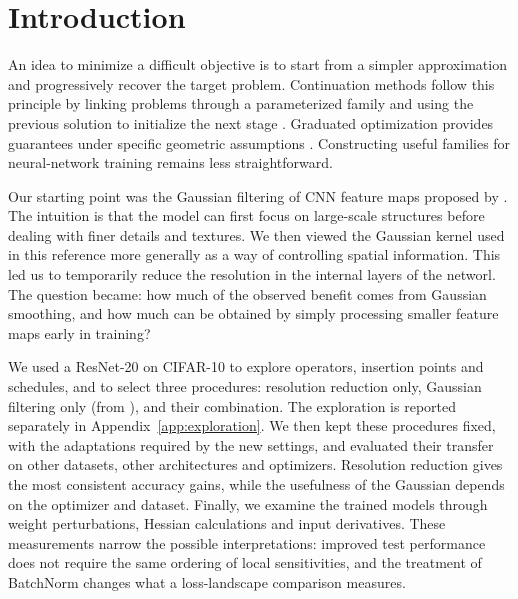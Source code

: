 \section{Introduction}
\label{sec:introduction}
An idea to minimize a difficult objective is to start from a simpler approximation and progressively recover the target problem. Continuation methods follow this principle by linking problems through a parameterized family and using the previous solution to initialize the next stage \citep{allgower1990continuation,mobahi2015gaussian}. Graduated optimization provides guarantees under specific geometric assumptions \citep{hazan2016graduated}. Constructing useful families for neural-network training remains less straightforward.

Our starting point was the Gaussian filtering of CNN feature maps proposed by \citet{sinha2020curriculum}. The intuition is that the model can first focus on large-scale structures before dealing with finer details and textures. We then viewed the Gaussian kernel used in this reference more generally as a way of controlling spatial information. This led us to temporarily reduce the resolution in the internal layers of the networl. The question became: how much of the observed benefit comes from Gaussian smoothing, and how much can be obtained by simply processing smaller feature maps early in training?

We used a ResNet-20 on CIFAR-10 to explore operators, insertion points and schedules, and to select three procedures: resolution reduction only, Gaussian filtering only (from \cite{sinha2020curriculum}), and their combination. The exploration is reported separately in Appendix~\ref{app:exploration}. We then kept these procedures fixed, with the adaptations required by the new settings, and evaluated their transfer on other datasets, other architectures and optimizers. Resolution reduction gives the most consistent accuracy gains, while the usefulness of the Gaussian depends on the optimizer and dataset. Finally, we examine the trained models through weight perturbations, Hessian calculations and input derivatives. These measurements narrow the possible interpretations: improved test performance does not require the same ordering of local sensitivities, and the treatment of BatchNorm changes what a loss-landscape comparison measures.

